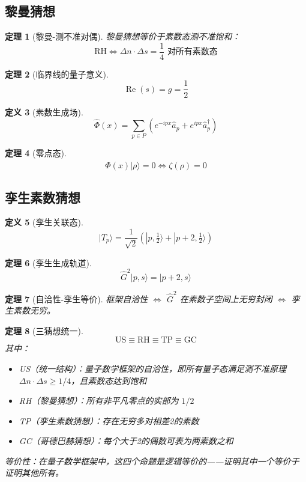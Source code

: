 \documentclass[12pt]{article}
\newtheorem{theorem}{定理}[section]
\theoremstyle{definition}
\newtheorem{definition}[theorem]{定义}
\begin{document}
\subsection{黎曼猜想}

\begin{theorem}[黎曼-测不准对偶]
黎曼猜想等价于素数态测不准饱和：
\[
\boxed{\text{RH} \iff \Delta n \cdot \Delta s = \frac{1}{4} \text{ 对所有素数态}}
\]
\end{theorem}

\begin{theorem}[临界线的量子意义]
\[
\operatorname{Re}(s) = g = \frac{1}{2}
\]
\end{theorem}

\begin{definition}[素数生成场]
\[
\hat{\Phi}(x) = \sum_{p \in P} \left( e^{-ipx} \hat{a}_p + e^{ipx} \hat{a}_p^\dagger \right)
\]
\end{definition}

\begin{theorem}[零点态]
\[
\hat{\Phi}(x)|\rho\rangle = 0 \iff \zeta(\rho) = 0
\]
\end{theorem}

\subsection{孪生素数猜想}

\begin{definition}[孪生关联态]
\[
|T_p\rangle = \frac{1}{\sqrt{2}} \left( |p, \tfrac{1}{2}\rangle + |p+2, \tfrac{1}{2}\rangle \right)
\]
\end{definition}

\begin{theorem}[孪生生成轨道]
\[
\hat{G}^2|p,s\rangle = |p+2,s\rangle
\]
\end{theorem}

\begin{theorem}[自洽性-孪生等价]
框架自洽性 \(\iff\) \(\hat{G}^2\) 在素数子空间上无穷封闭 \(\iff\) 孪生素数无穷。
\end{theorem}

\begin{theorem}[三猜想统一]
\[
\boxed{\text{US} \equiv \text{RH} \equiv \text{TP} \equiv \text{GC}}
\]
其中：
\begin{itemize}
    \item US（统一结构）：量子数学框架的自洽性，即所有量子态满足测不准原理 \(\Delta n \cdot \Delta s \geq 1/4\)，且素数态达到饱和
    \item RH（黎曼猜想）：所有非平凡零点的实部为 \(1/2\)
    \item TP（孪生素数猜想）：存在无穷多对相差2的素数
    \item GC（哥德巴赫猜想）：每个大于2的偶数可表为两素数之和
\end{itemize}
等价性：在量子数学框架中，这四个命题是逻辑等价的——证明其中一个等价于证明其他所有。
\end{theorem}
\end{document}
